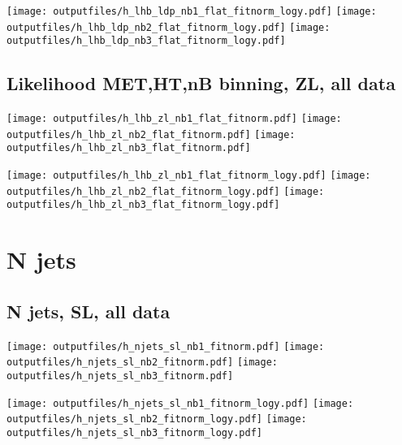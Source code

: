 \documentclass[11pt]{article}
\begin{document}
    \noindent
     \texttt{[image: outputfiles/h\_lhb\_ldp\_nb1\_flat\_fitnorm\_logy.pdf]}
     \texttt{[image: outputfiles/h\_lhb\_ldp\_nb2\_flat\_fitnorm\_logy.pdf]}
     \texttt{[image: outputfiles/h\_lhb\_ldp\_nb3\_flat\_fitnorm\_logy.pdf]}

   \clearpage

    \subsection{ Likelihood MET,HT,nB binning, ZL, all data}

    \noindent
     \texttt{[image: outputfiles/h\_lhb\_zl\_nb1\_flat\_fitnorm.pdf]}
     \texttt{[image: outputfiles/h\_lhb\_zl\_nb2\_flat\_fitnorm.pdf]}
     \texttt{[image: outputfiles/h\_lhb\_zl\_nb3\_flat\_fitnorm.pdf]}

    \noindent
     \texttt{[image: outputfiles/h\_lhb\_zl\_nb1\_flat\_fitnorm\_logy.pdf]}
     \texttt{[image: outputfiles/h\_lhb\_zl\_nb2\_flat\_fitnorm\_logy.pdf]}
     \texttt{[image: outputfiles/h\_lhb\_zl\_nb3\_flat\_fitnorm\_logy.pdf]}

   \clearpage







  \clearpage
   \section{ N jets }

    \subsection{ N jets, SL, all data}

    \noindent
     \texttt{[image: outputfiles/h\_njets\_sl\_nb1\_fitnorm.pdf]}
     \texttt{[image: outputfiles/h\_njets\_sl\_nb2\_fitnorm.pdf]}
     \texttt{[image: outputfiles/h\_njets\_sl\_nb3\_fitnorm.pdf]}

    \noindent
     \texttt{[image: outputfiles/h\_njets\_sl\_nb1\_fitnorm\_logy.pdf]}
     \texttt{[image: outputfiles/h\_njets\_sl\_nb2\_fitnorm\_logy.pdf]}
     \texttt{[image: outputfiles/h\_njets\_sl\_nb3\_fitnorm\_logy.pdf]}
\end{document}
